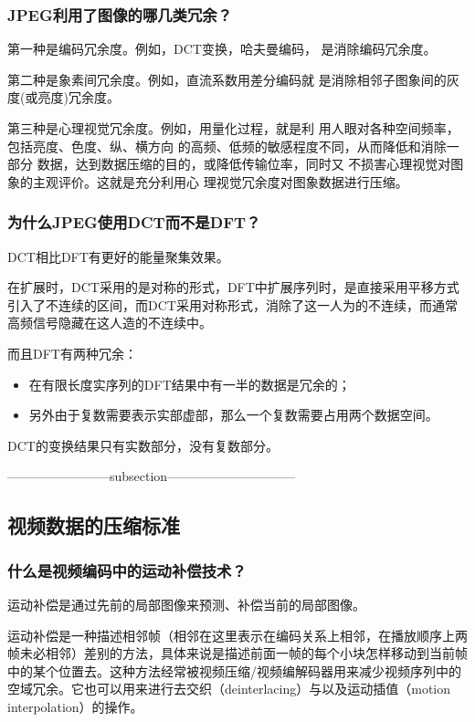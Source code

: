 \documentclass[UTF8,a4paper,AutoFakeBold,AutoFakeSlant]{ctexart}
\begin{document}
\subsubsection{JPEG利用了图像的哪几类冗余？}

第一种是编码冗余度。例如，DCT变换，哈夫曼编码，
是消除编码冗余度。

第二种是象素间冗余度。例如，直流系数用差分编码就
是消除相邻子图象间的灰度(或亮度)冗余度。

第三种是心理视觉冗余度。例如，用量化过程，就是利
用人眼对各种空间频率，包括亮度、色度、纵、横方向
的高频、低频的敏感程度不同，从而降低和消除一部分
数据，达到数据压缩的目的，或降低传输位率，同时又
不损害心理视觉对图象的主观评价。这就是充分利用心
理视觉冗余度对图象数据进行压缩。



\subsubsection{为什么JPEG使用DCT而不是DFT？}

DCT相比DFT有更好的能量聚集效果。

在扩展时，DCT采用的是对称的形式，DFT中扩展序列时，是直接采用平移方式引入了不连续的区间，而DCT采用对称形式，消除了这一人为的不连续，而通常高频信号隐藏在这人造的不连续中。

而且DFT有两种冗余：
\begin{itemize}
	\item 在有限长度实序列的DFT结果中有一半的数据是冗余的；
	\item 另外由于复数需要表示实部虚部，那么一个复数需要占用两个数据空间。
\end{itemize}
DCT的变换结果只有实数部分，没有复数部分。



------------------------subsection------------------------------
\subsection{视频数据的压缩标准}


\subsubsection{什么是视频编码中的运动补偿技术？}

运动补偿是通过先前的局部图像来预测、补偿当前的局部图像。

运动补偿是一种描述相邻帧（相邻在这里表示在编码关系上相邻，在播放顺序上两帧未必相邻）差别的方法，具体来说是描述前面一帧的每个小块怎样移动到当前帧中的某个位置去。这种方法经常被视频压缩/视频编解码器用来减少视频序列中的空域冗余。它也可以用来进行去交织（deinterlacing）与以及运动插值（motion interpolation）的操作。
\end{document}

